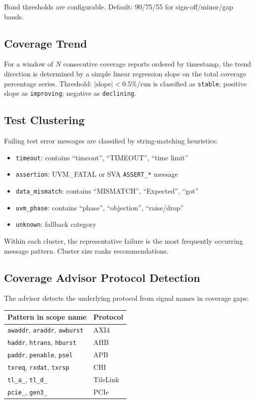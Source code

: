 \documentclass[11pt,a4paper]{article}
\begin{document}
Band thresholds are configurable. Default: 90/75/55 for sign-off/minor/gap bands.

\subsection{Coverage Trend}

For a window of $N$ consecutive coverage reports ordered by timestamp, the trend
direction is determined by a simple linear regression slope on the total coverage
percentage series. Threshold: $|\text{slope}| < 0.5\%$/run is classified as
\texttt{stable}; positive slope as \texttt{improving}; negative as \texttt{declining}.

\subsection{Test Clustering}

Failing test error messages are classified by string-matching heuristics:
\begin{itemize}
  \item \texttt{timeout}: contains ``timeout'', ``TIMEOUT'', ``time limit''
  \item \texttt{assertion}: UVM\_FATAL or SVA \texttt{ASSERT\_*} message
  \item \texttt{data\_mismatch}: contains ``MISMATCH'', ``Expected'', ``got''
  \item \texttt{uvm\_phase}: contains ``phase'', ``objection'', ``raise/drop''
  \item \texttt{unknown}: fallback category
\end{itemize}

Within each cluster, the representative failure is the most frequently occurring
message pattern. Cluster size ranks recommendations.

\subsection{Coverage Advisor Protocol Detection}

The advisor detects the underlying protocol from signal names in coverage gaps:
\begin{center}
\begin{tabular}{ll}
\toprule
\textbf{Pattern in scope name} & \textbf{Protocol} \\
\midrule
\verb|awaddr|, \verb|araddr|, \verb|awburst| & AXI4 \\
\verb|haddr|, \verb|htrans|, \verb|hburst| & AHB \\
\verb|paddr|, \verb|penable|, \verb|psel| & APB \\
\verb|txreq|, \verb|rxdat|, \verb|txrsp| & CHI \\
\verb|tl_a_|, \verb|tl_d_| & TileLink \\
\verb|pcie_|, \verb|gen3_| & PCIe \\
\bottomrule
\end{tabular}
\end{center}
\end{document}
